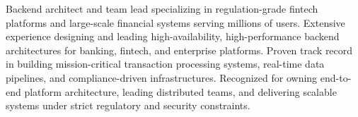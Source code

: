 Backend architect and team lead specializing in regulation-grade fintech platforms and large-scale financial systems serving millions of users. Extensive experience designing and leading high-availability, high-performance backend architectures for banking, fintech, and enterprise platforms. Proven track record in building mission-critical transaction processing systems, real-time data pipelines, and compliance-driven infrastructures. Recognized for owning end-to-end platform architecture, leading distributed teams, and delivering scalable systems under strict regulatory and security constraints.
